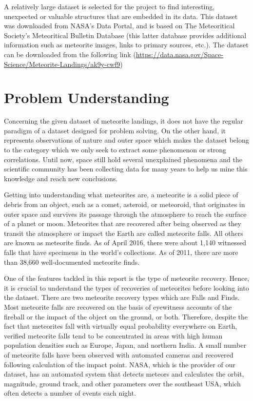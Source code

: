 A relatively large dataset is selected for the project to find interesting, unexpected or valuable
structures that are embedded in its data. This dataset was downloaded from NASA’s Data Portal, and is based on The Meteoritical Society's Meteoritical Bulletin Database (this latter database provides additional information such as meteorite images, links to primary sources, etc.). The dataset can be downloaded from the following link (\url{https://data.nasa.gov/Space-Science/Meteorite-Landings/ak9y-cwf9})



\section{Problem Understanding}
Concerning the given dataset of meteorite landings, it does not have the regular paradigm of a dataset designed for problem solving. On the other hand, it represents observations of nature and outer space which makes the dataset belong to the category which we only seek to extract some phenomenon or strong correlations. Until now, space still hold several unexplained phenomena and the scientific community has been collecting data for many years to help us mine this knowledge and reach new conclusions.

Getting into understanding what meteorites are, a meteorite is a solid piece of debris from an object, such as a comet, asteroid, or meteoroid, that originates in outer space and survives its passage through the atmosphere to reach the surface of a planet or moon. Meteorites that are recovered after being observed as they transit the atmosphere or impact the Earth are called meteorite falls. All others are known as meteorite finds. As of April 2016, there were about 1,140 witnessed falls that have specimens in the world's collections. As of 2011, there are more than 38,660 well-documented meteorite finds.

One of the features tackled in this report is the type of meteorite recovery. Hence, it is crucial to understand the types of recoveries of meteorites before looking into the dataset. There are two meteorite recovery types which are Falls and Finds. Most meteorite falls are recovered on the basis of eyewitness accounts of the fireball or the impact of the object on the ground, or both. Therefore, despite the fact that meteorites fall with virtually equal probability everywhere on Earth, verified meteorite falls tend to be concentrated in areas with high human population densities such as Europe, Japan, and northern India. A small number of meteorite falls have been observed with automated cameras and recovered following calculation of the impact point. NASA, which is the provider of our dataset, has an automated system that detects meteors and calculates the orbit, magnitude, ground track, and other parameters over the southeast USA, which often detects a number of events each night.

